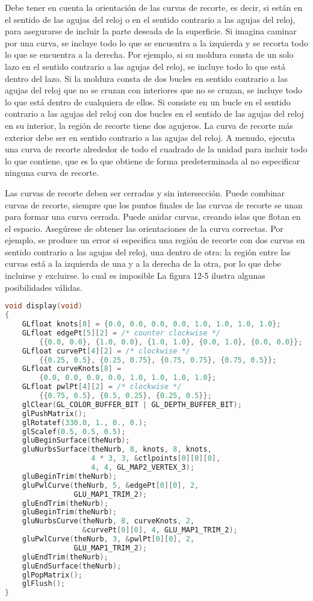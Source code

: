 \documentclass[]{article}
\begin{document}
Debe tener en cuenta la orientación de las curvas de recorte, es decir, si están en el sentido de las agujas del reloj o en el sentido contrario a las agujas del reloj, para asegurarse de incluir la parte deseada de la superficie. Si imagina caminar por una curva, se incluye todo lo que se encuentra a la izquierda y se recorta todo lo que se encuentra a la derecha. Por ejemplo, si su moldura consta de un solo lazo en el sentido contrario a las agujas del reloj, se incluye todo lo que está dentro del lazo. Si la moldura consta de dos bucles en sentido contrario a las agujas del reloj que no se cruzan con interiores que no se cruzan, se incluye todo lo que está dentro de cualquiera de ellos. Si consiste en un bucle en el sentido contrario a las agujas del reloj con dos bucles en el sentido de las agujas del reloj en su interior, la región de recorte tiene dos agujeros. La curva de recorte más exterior debe ser en sentido contrario a las agujas del reloj. A menudo, ejecuta una curva de recorte alrededor de todo el cuadrado de la unidad para incluir todo lo que contiene, que es lo que obtiene de forma predeterminada al no especificar ninguna curva de recorte.

Las curvas de recorte deben ser cerradas y sin intersección. Puede combinar curvas de recorte, siempre que los puntos finales de las curvas de recorte se unan para formar una curva cerrada. Puede anidar curvas, creando islas que flotan en el espacio. Asegúrese de obtener las orientaciones de la curva correctas. Por ejemplo, se produce un error si especifica una región de recorte con dos curvas en sentido contrario a las agujas del reloj, una dentro de otra: la región entre las curvas está a la izquierda de una y a la derecha de la otra, por lo que debe incluirse y excluirse. lo cual es imposible La figura 12-5 ilustra algunas posibilidades válidas.

\begin{lstlisting}[language=C++]
void display(void)
{
    GLfloat knots[8] = {0.0, 0.0, 0.0, 0.0, 1.0, 1.0, 1.0, 1.0};
    GLfloat edgePt[5][2] = /* counter clockwise */
        {{0.0, 0.0}, {1.0, 0.0}, {1.0, 1.0}, {0.0, 1.0}, {0.0, 0.0}};
    GLfloat curvePt[4][2] = /* clockwise */
        {{0.25, 0.5}, {0.25, 0.75}, {0.75, 0.75}, {0.75, 0.5}};
    GLfloat curveKnots[8] =
        {0.0, 0.0, 0.0, 0.0, 1.0, 1.0, 1.0, 1.0};
    GLfloat pwlPt[4][2] = /* clockwise */
        {{0.75, 0.5}, {0.5, 0.25}, {0.25, 0.5}};
    glClear(GL_COLOR_BUFFER_BIT | GL_DEPTH_BUFFER_BIT);
    glPushMatrix();
    glRotatef(330.0, 1., 0., 0.);
    glScalef(0.5, 0.5, 0.5);
    gluBeginSurface(theNurb);
    gluNurbsSurface(theNurb, 8, knots, 8, knots,
                    4 * 3, 3, &ctlpoints[0][0][0],
                    4, 4, GL_MAP2_VERTEX_3);
    gluBeginTrim(theNurb);
    gluPwlCurve(theNurb, 5, &edgePt[0][0], 2,
                GLU_MAP1_TRIM_2);
    gluEndTrim(theNurb);
    gluBeginTrim(theNurb);
    gluNurbsCurve(theNurb, 8, curveKnots, 2,
                  &curvePt[0][0], 4, GLU_MAP1_TRIM_2);
    gluPwlCurve(theNurb, 3, &pwlPt[0][0], 2,
                GLU_MAP1_TRIM_2);
    gluEndTrim(theNurb);
    gluEndSurface(theNurb);
    glPopMatrix();
    glFlush();
}
\end{lstlisting}
\end{document}

